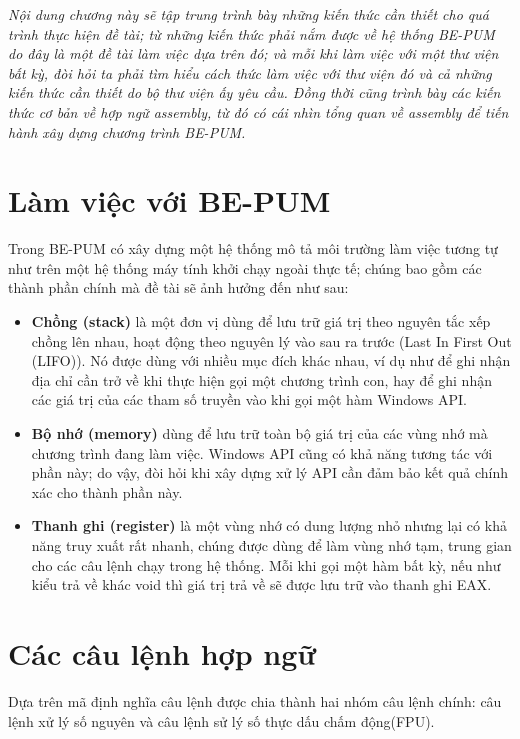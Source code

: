
\begin{concept}[15cm]
\textit{Nội dung chương này sẽ tập trung trình bày những kiến thức cần thiết cho quá trình thực hiện đề tài; từ những kiến thức phải nắm được về hệ thống BE-PUM do đây là một đề tài làm việc dựa trên đó; và mỗi khi làm việc với một thư viện bất kỳ, đòi hỏi ta phải tìm hiểu cách thức làm việc với thư viện đó và cả những kiến thức cần thiết do bộ thư viện ấy yêu cầu. Đồng thời cũng trình bày các kiến thức cơ bản về hợp ngữ assembly, từ đó có cái nhìn tổng quan về assembly để tiến hành xây dựng chương trình BE-PUM.}
\end{concept}

\newpage
\section{Làm việc với BE-PUM}

Trong BE-PUM có xây dựng một hệ thống mô tả môi trường làm việc tương tự như trên một hệ thống máy tính khởi chạy ngoài thực tế; chúng bao gồm các thành phần chính mà đề tài sẽ ảnh hưởng đến như sau:

\begin{itemize}
\item 	\textbf{Chồng (stack)} là một đơn vị dùng để lưu trữ giá trị theo nguyên tắc xếp chồng lên nhau, hoạt động theo nguyên lý vào sau ra trước (Last In First Out (LIFO)). Nó được dùng với nhiều mục đích khác nhau, ví dụ như để ghi nhận địa chỉ cần trở về khi thực hiện gọi một chương trình con, hay để ghi nhận các giá trị của các tham số truyền vào khi gọi một hàm Windows API.\\

\item 	\textbf{Bộ nhớ (memory)} dùng để lưu trữ toàn bộ giá trị của các vùng nhớ mà chương trình đang làm việc. Windows API cũng có khả năng tương tác với phần này; do vậy, đòi hỏi khi xây dựng xử lý API cần đảm bảo kết quả chính xác cho thành phần này.\\

\item 	\textbf{Thanh ghi (register)} là một vùng nhớ có dung lượng nhỏ nhưng lại có khả năng truy xuất rất nhanh, chúng được dùng để làm vùng nhớ tạm, trung gian cho các câu lệnh chạy trong hệ thống. Mỗi khi gọi một hàm bất kỳ, nếu như kiểu trả về khác void thì giá trị trả về sẽ được lưu trữ vào thanh ghi EAX.\\
\end{itemize}

\newpage
\section{Các câu lệnh hợp ngữ}
	Dựa trên mã định nghĩa câu lệnh được chia thành hai nhóm câu lệnh chính: câu lệnh xử lý số nguyên và câu lệnh sử lý số thực dấu chấm động(FPU).
